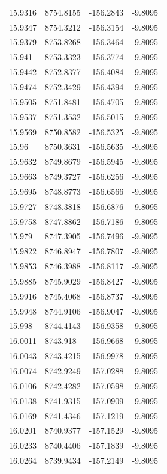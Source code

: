 \begin{table}[H]
\begin{tabular}{llll}
15.9316 & 8754.8155 & -156.2843 & -9.8095 \\
15.9347 & 8754.3212 & -156.3154 & -9.8095 \\
15.9379 & 8753.8268 & -156.3464 & -9.8095 \\
15.941 & 8753.3323 & -156.3774 & -9.8095 \\
15.9442 & 8752.8377 & -156.4084 & -9.8095 \\
15.9474 & 8752.3429 & -156.4394 & -9.8095 \\
15.9505 & 8751.8481 & -156.4705 & -9.8095 \\
15.9537 & 8751.3532 & -156.5015 & -9.8095 \\
15.9569 & 8750.8582 & -156.5325 & -9.8095 \\
15.96 & 8750.3631 & -156.5635 & -9.8095 \\
15.9632 & 8749.8679 & -156.5945 & -9.8095 \\
15.9663 & 8749.3727 & -156.6256 & -9.8095 \\
15.9695 & 8748.8773 & -156.6566 & -9.8095 \\
15.9727 & 8748.3818 & -156.6876 & -9.8095 \\
15.9758 & 8747.8862 & -156.7186 & -9.8095 \\
15.979 & 8747.3905 & -156.7496 & -9.8095 \\
15.9822 & 8746.8947 & -156.7807 & -9.8095 \\
15.9853 & 8746.3988 & -156.8117 & -9.8095 \\
15.9885 & 8745.9029 & -156.8427 & -9.8095 \\
15.9916 & 8745.4068 & -156.8737 & -9.8095 \\
15.9948 & 8744.9106 & -156.9047 & -9.8095 \\
15.998 & 8744.4143 & -156.9358 & -9.8095 \\
16.0011 & 8743.918 & -156.9668 & -9.8095 \\
16.0043 & 8743.4215 & -156.9978 & -9.8095 \\
16.0074 & 8742.9249 & -157.0288 & -9.8095 \\
16.0106 & 8742.4282 & -157.0598 & -9.8095 \\
16.0138 & 8741.9315 & -157.0909 & -9.8095 \\
16.0169 & 8741.4346 & -157.1219 & -9.8095 \\
16.0201 & 8740.9377 & -157.1529 & -9.8095 \\
16.0233 & 8740.4406 & -157.1839 & -9.8095 \\
16.0264 & 8739.9434 & -157.2149 & -9.8095 \\

\end{tabular}
\end{table}
